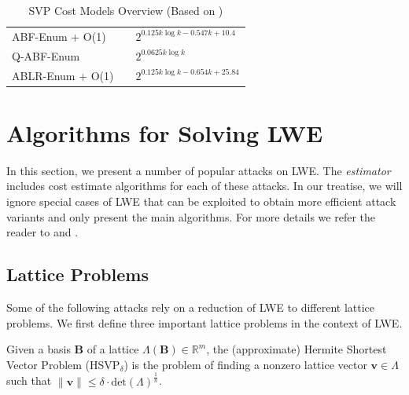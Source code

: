 \begin{table}
\begin{tabular}{lll}
    ABF-Enum + O(1)                  & \cite{ABFKSW20}                 & $2^{0.125k \log k - 0.547k + 10.4}$   \\
    Q-ABF-Enum                       & \cite{ABFKSW20}                 & $2^{0.0625 k \log k}$                 \\
    ABLR-Enum + O(1)                 & \cite{ABLR21}                   & $2^{0.125k \log k - 0.654k + 25.84}$  \\
    \bottomrule
  \end{tabular}
  \caption[SVP Cost Models Overview]{SVP Cost Models Overview (Based on \cite[Table~4]{ACDDPPVW18})} %
  \label{tab:costmodels}
\end{table} %










\section{Algorithms for Solving LWE}
In this section, we present a number of popular attacks on LWE. The \textit{estimator} includes cost estimate algorithms for each of these attacks. In our treatise, we will ignore special cases of LWE that can be exploited to obtain more efficient attack variants and only present the main algorithms. For more details we refer the reader to \cite{APS15} and \cite{BBGS19}.

\subsection{Lattice Problems}
Some of the following attacks rely on a reduction of LWE to different lattice problems. We first define three important lattice problems in the context of LWE.

\begin{definition} \label{def:hsvp}
  Given a basis $\mathbf{B}$ of a lattice $\Lambda(\mathbf{B}) \in \mathbb{R}^m$, the (approximate)  Hermite Shortest Vector Problem (HSVP$_\delta$) is the problem of finding a nonzero lattice vector $\mathbf{v} \in \Lambda$ such that $\| \mathbf{v} \| \leq \delta \cdot \text{det}(\Lambda)^{\frac{1}{n}}$.
\end{definition}


